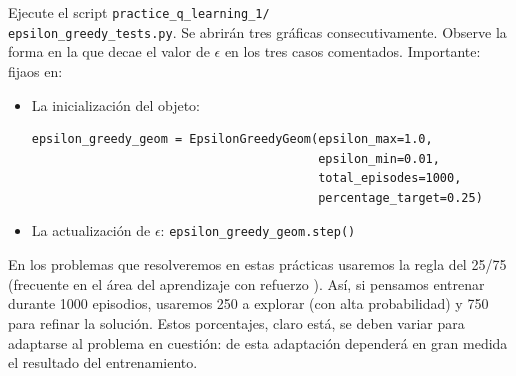 \documentclass{article}
\begin{document}
\begin{exercise}
    Ejecute el script \texttt{practice\_q\_learning\_1/\\epsilon\_greedy\_tests.py}. Se abrirán tres gráficas consecutivamente. Observe la forma en la que decae el valor de $\epsilon$ en los tres casos comentados. Importante: fijaos en:
    \begin{itemize}
        \item La inicialización del objeto:
        \begin{verbatim}
epsilon_greedy_geom = EpsilonGreedyGeom(epsilon_max=1.0, 
                                        epsilon_min=0.01,
                                        total_episodes=1000,
                                        percentage_target=0.25)   
        \end{verbatim}        
        \item La actualización de $\epsilon$:
        \texttt{epsilon\_greedy\_geom.step()}
    \end{itemize}
\end{exercise}

En los problemas que resolveremos en estas prácticas usaremos la regla del 25/75 (frecuente en el área del aprendizaje con refuerzo   \cite{sutton2018reinforcement}). Así, si pensamos entrenar durante 1000 episodios, usaremos 250 a explorar (con alta probabilidad) y 750 para refinar la solución. Estos porcentajes, claro está, se deben variar para adaptarse al problema en cuestión: de esta adaptación dependerá en gran medida el resultado del entrenamiento.




\end{document}
